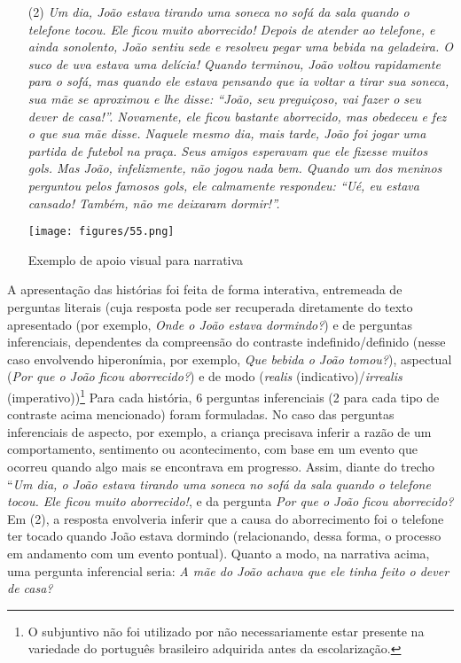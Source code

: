 \documentclass[output=paper,colorlinks,citecolor=brown,booklanguage=portuguese]{langscibook}
\begin{document}
\begin{enumerate}
\item[(2)] \emph{Um dia, João estava tirando uma soneca no sofá da sala quando o telefone tocou. Ele ficou muito aborrecido! Depois de atender ao telefone, e ainda sonolento, João sentiu sede e resolveu pegar uma bebida na geladeira. O suco de uva estava uma delícia! Quando terminou, João voltou rapidamente para o sofá, mas quando ele estava pensando que ia voltar a tirar sua soneca, sua mãe se aproximou e lhe disse: “João, seu preguiçoso, vai fazer o seu dever de casa!”. Novamente, ele ficou bastante aborrecido, mas obedeceu e fez o que sua mãe disse. Naquele mesmo dia, mais tarde, João foi jogar uma partida de futebol na praça. Seus amigos esperavam que ele fizesse muitos gols. Mas João, infelizmente, não jogou nada bem. Quando um dos meninos perguntou pelos famosos gols, ele calmamente respondeu: “Ué, eu estava cansado! Também, não me deixaram dormir!”.}

\item [] \begin{Figura}
    \texttt{[image: figures/55.png]}


    \caption{{Exemplo de apoio visual para narrativa}}
    \label{fig:cap15fig3}
\end{Figura}
\end{enumerate}


A apresentação das histórias foi feita de forma interativa, entremeada de perguntas literais (cuja resposta pode ser recuperada diretamente do texto apresentado (por exemplo, \emph{Onde o João estava dormindo?}) e de perguntas inferenciais, dependentes da compreensão do contraste indefinido/definido (nesse caso envolvendo hiperonímia, por exemplo, \emph{Que bebida o João tomou?}), aspectual (\emph{Por que o João ficou aborrecido?}) e de modo (\emph{realis} (indicativo)/\emph{irrealis} (imperativo))\footnote{O subjuntivo não foi utilizado por não necessariamente estar presente na variedade do português brasileiro adquirida antes da escolarização.} Para cada história, 6 perguntas inferenciais (2 para cada tipo de contraste acima mencionado) foram formuladas. No caso das perguntas inferenciais de aspecto, por exemplo, a criança precisava inferir a razão de um comportamento, sentimento ou acontecimento, com base em um evento que ocorreu quando algo mais se encontrava em progresso. Assim, diante do trecho “\emph{Um dia, o João estava tirando uma soneca no sofá da sala quando o telefone tocou. Ele ficou muito aborrecido!}, e da pergunta \emph{Por que o João ficou aborrecido?} Em (2), a resposta envolveria inferir que a causa do aborrecimento foi o telefone ter tocado quando João estava dormindo (relacionando, dessa forma, o processo em andamento com um evento pontual). Quanto a modo, na narrativa acima, uma pergunta inferencial seria: \emph{A mãe do João achava que ele tinha feito o dever de casa?} 
\end{document}

